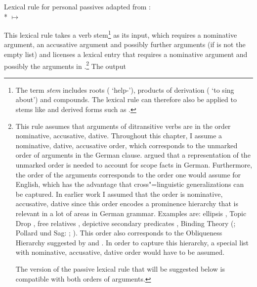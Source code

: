 \ea
\label{pass-lr-mlr}
Lexical rule for personal passives adapted from \citet{Kiss92}:\\*
 $\mapsto$ \\
\flushright{}
\z

\addlines
\noindent
This lexical rule takes a verb stem\footnote{
	The term \emph{stem} includes roots ( `help-'), products of derivation
        ( `to sing about') and compounds. The lexical rule can therefore also be applied to
        stems like  and derived forms such as .%
} as its input, which requires a nominative argument, an accusative argument and possibly further arguments (if  is not the empty
list) and licenses a lexical entry that requires a nominative argument and possibly the arguments in
.\footnote{
  This rule assumes that arguments of ditransitive verbs are in the order nominative, accusative,
  dative. Throughout this chapter, I assume a nominative, dative, accusative order, which
  corresponds to the unmarked order of arguments in the German clause. \citet{Kiss2001a} argued that
  a representation of the unmarked order is needed to account for scope facts in
  German. Furthermore, the order of the arguments corresponds to the order one would assume for
  English, which has the advantage that cross"=linguistic generalizations can be captured. In
  earlier work I assumed that the order is nominative, accusative, dative since this order encodes a
  prominence hierarchy that is relevant in a lot of areas in German grammar. Examples are: ellipsis \citep{Klein85},
  Topic Drop \citep{Fries88b}, free relatives
  \citep{Bausewein90,Pittner95b,Mueller99b},
  depictive secondary predicates \citep{Mueller2001c,Mueller2002b,Mueller2008a},
  Binding Theory (\citealp{Grewendorf85a}; Pollard und Sag: \citeyear{PS92};
  \citeyear[Chapter~6]{ps2}). This order also corresponds to the Obliqueness
  Hierarchy suggested by \citet{KC77a} and \citet{Pullum77a}. In order to capture
  this hierarchy, a special list with nominative, accusative, dative order would have to be assumed.

  The version of the passive lexical rule that will be suggested below is compatible with both orders of arguments.
} The output
